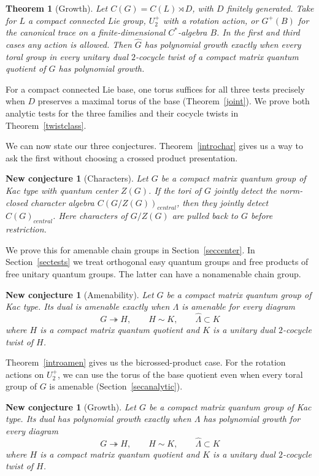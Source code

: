 \documentclass[11pt,a4paper]{article}
\newtheorem{introthm}[oldconj]{Theorem}
\newtheorem{newconj}[oldconj]{New conjecture}
\theoremstyle{remark}
\begin{document}
\begin{introthm}[Growth]\label{introgrowth}
Let $C(G)=C(L)\rtimes D$, with $D$ finitely generated. Take for
$L$ a compact connected Lie group, $U_2^+$ with a rotation action, or
$G^+(B)$ for the canonical trace on a finite-dimensional
$C^*$-algebra $B$. In the first and third cases any action is allowed.
Then $\widehat G$ has polynomial growth exactly when every toral group in
every unitary dual $2$-cocycle twist of a compact matrix quantum quotient
of $G$ has polynomial growth.
\end{introthm}

For a compact connected Lie base, one torus suffices for all three
tests precisely when $D$ preserves a maximal torus of the base
(Theorem~\ref{joint}). We prove both analytic tests for the
three families and their cocycle twists in Theorem~\ref{twistclass}.

We can now state our three conjectures. Theorem~\ref{introchar} gives
us a way to ask the first without choosing a crossed product presentation.

\begin{newconj}[Characters]\label{newchar}
Let $G$ be a compact matrix quantum group of Kac type with quantum
center $Z(G)$. If the tori of $G$ jointly detect the norm-closed
character algebra $C(G/Z(G))_{central}$, then they jointly detect $C(G)_{central}$.
Here characters of $G/Z(G)$ are pulled back to $G$ before restriction.
\end{newconj}

We prove this for amenable chain groups in Section~\ref{seccenter}.
In Section~\ref{sectests} we treat orthogonal easy quantum groups and
free products of free unitary quantum groups. The latter can have a
nonamenable chain group.

\begin{newconj}[Amenability]\label{newamen}
Let $G$ be a compact matrix quantum group of Kac type. Its dual is
amenable exactly when $\Lambda$ is amenable for every diagram
\[
 G\twoheadrightarrow H,\qquad H\sim K,\qquad \widehat\Lambda\subset K
\]
where $H$ is a compact matrix quantum quotient and $K$ is a unitary
dual $2$-cocycle twist of $H$.
\end{newconj}

Theorem~\ref{introamen} gives us the bicrossed-product case. For the
rotation actions on $U_2^+$, we can use the torus of the base quotient
even when every toral group of $G$ is amenable
(Section~\ref{secanalytic}).

\begin{newconj}[Growth]\label{newgrowth}
Let $G$ be a compact matrix quantum group of Kac type. Its dual has
polynomial growth exactly when $\Lambda$ has polynomial growth for
every diagram
\[
 G\twoheadrightarrow H,\qquad H\sim K,\qquad \widehat\Lambda\subset K
\]
where $H$ is a compact matrix quantum quotient and $K$ is a unitary
dual $2$-cocycle twist of $H$.
\end{newconj}
\end{document}
